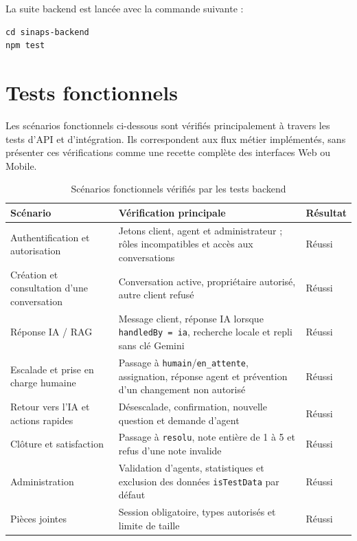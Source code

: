 La suite backend est lancée avec la commande suivante :

\begin{lstlisting}[caption={Exécution de la suite backend}]
cd sinaps-backend
npm test
\end{lstlisting}

\section{Tests fonctionnels}

Les scénarios fonctionnels ci-dessous sont vérifiés principalement à travers les tests d'API et d'intégration. Ils correspondent aux flux métier implémentés, sans présenter ces vérifications comme une recette complète des interfaces Web ou Mobile.

\begin{table}[H]
\centering
\caption{Scénarios fonctionnels vérifiés par les tests backend}
\label{tab:t-fonctionnels}
\small
\begin{tabularx}{\textwidth}{|l|X|l|}
\hline
Scénario & Vérification principale & Résultat \\
\hline
Authentification et autorisation & Jetons client, agent et administrateur ; rôles incompatibles et accès aux conversations & Réussi \\
\hline
Création et consultation d'une conversation & Conversation active, propriétaire autorisé, autre client refusé & Réussi \\
\hline
Réponse IA / RAG & Message client, réponse IA lorsque \texttt{handledBy = ia}, recherche locale et repli sans clé Gemini & Réussi \\
\hline
Escalade et prise en charge humaine & Passage à \texttt{humain}/\texttt{en\_attente}, assignation, réponse agent et prévention d'un changement non autorisé & Réussi \\
\hline
Retour vers l'IA et actions rapides & Désescalade, confirmation, nouvelle question et demande d'agent & Réussi \\
\hline
Clôture et satisfaction & Passage à \texttt{resolu}, note entière de 1 à 5 et refus d'une note invalide & Réussi \\
\hline
Administration & Validation d'agents, statistiques et exclusion des données \texttt{isTestData} par défaut & Réussi \\
\hline
Pièces jointes & Session obligatoire, types autorisés et limite de taille & Réussi \\
\hline
\end{tabularx}
\end{table}


